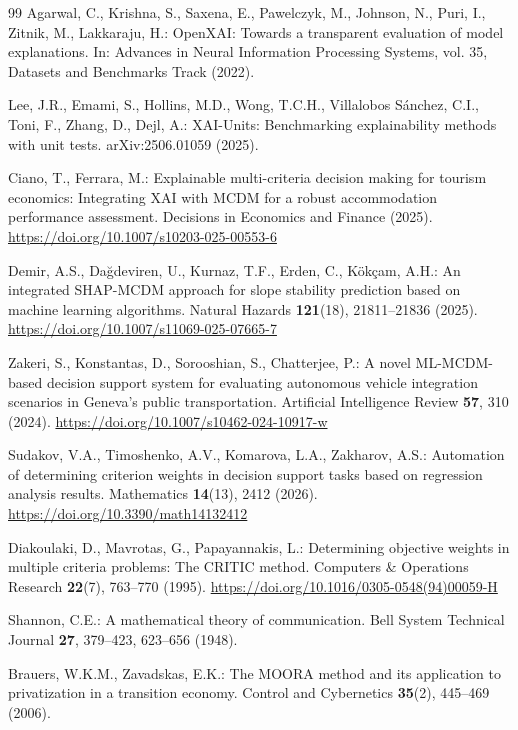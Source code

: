 \documentclass[runningheads]{llncs}
\begin{document}
\begin{thebibliography}{99}
Agarwal, C., Krishna, S., Saxena, E., Pawelczyk, M., Johnson, N., Puri, I., Zitnik, M.,
Lakkaraju, H.:
OpenXAI: Towards a transparent evaluation of model explanations.
In: Advances in Neural Information Processing Systems, vol. 35, Datasets and Benchmarks Track
(2022).

Lee, J.R., Emami, S., Hollins, M.D., Wong, T.C.H., Villalobos S\'anchez, C.I., Toni, F.,
Zhang, D., Dejl, A.:
XAI-Units: Benchmarking explainability methods with unit tests.
arXiv:2506.01059 (2025).

Ciano, T., Ferrara, M.:
Explainable multi-criteria decision making for tourism economics: Integrating XAI with MCDM for
a robust accommodation performance assessment.
Decisions in Economics and Finance (2025).
\url{https://doi.org/10.1007/s10203-025-00553-6}

Demir, A.S., Da{\u g}deviren, U., Kurnaz, T.F., Erden, C., K{\"o}k{\c c}am, A.H.:
An integrated SHAP-MCDM approach for slope stability prediction based on machine learning
algorithms.
Natural Hazards \textbf{121}(18), 21811--21836 (2025).
\url{https://doi.org/10.1007/s11069-025-07665-7}

Zakeri, S., Konstantas, D., Sorooshian, S., Chatterjee, P.:
A novel ML-MCDM-based decision support system for evaluating autonomous vehicle integration
scenarios in Geneva's public transportation.
Artificial Intelligence Review \textbf{57}, 310 (2024).
\url{https://doi.org/10.1007/s10462-024-10917-w}

Sudakov, V.A., Timoshenko, A.V., Komarova, L.A., Zakharov, A.S.:
Automation of determining criterion weights in decision support tasks based on regression
analysis results.
Mathematics \textbf{14}(13), 2412 (2026).
\url{https://doi.org/10.3390/math14132412}

Diakoulaki, D., Mavrotas, G., Papayannakis, L.:
Determining objective weights in multiple criteria problems: The CRITIC method.
Computers \& Operations Research \textbf{22}(7), 763--770 (1995).
\url{https://doi.org/10.1016/0305-0548(94)00059-H}

Shannon, C.E.:
A mathematical theory of communication.
Bell System Technical Journal \textbf{27}, 379--423, 623--656 (1948).

Brauers, W.K.M., Zavadskas, E.K.:
The MOORA method and its application to privatization in a transition economy.
Control and Cybernetics \textbf{35}(2), 445--469 (2006).


\end{thebibliography}
\end{document}
